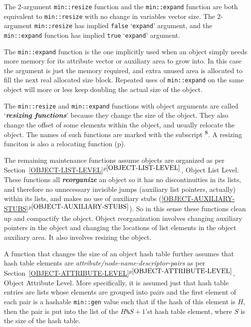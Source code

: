 \documentclass[12pt]{article}
\makeatletter
\newcommand{\skey}[2]{{\bf \em #1#2}\index{#1}}
\newcommand{\ikey}[2]{{\bf \em #1}\index{#2}}
\newcommand{\subsmkey}[2]{$\mathbf{^{#1}}$\index{#1@$^{#1}$!#2}}
\newcommand{\itemref}[1]{\ref{#1}$^{p\pageref{#1}}$}
\newcommand{\pagref}[1]{p\pageref{#1}}
\newcommand{\EOL}{\penalty \exhyphenpenalty}
\makeatother
\begin{document}
The 2-argument {\tt min::resize} function and the {\tt min::\EOL expand}
function are both equivalent to {\tt min::\EOL resize} with no change
in variables vector size.  The 2-argument {\tt min::\EOL resize}
has implied {\tt false} `{\tt expand}' argument, and the
{\tt min::\EOL expand} function has implied {\tt true} `{\tt expand}'
argument.

The {\tt min::expand} function is the one implicitly used when an object simply
needs more memory for its attribute vector or auxiliary area to grow into.
In this case the argument is just the memory required, and extra unused
area is allocated to fill the next real allocated size block.  Repeated
uses of {\tt min::expand} on the same object will more or less keep
doubling the actual size of the object.

The {\tt min::resize} and {\tt min::expand} functions with object arguments
are called `\skey{resizing function}s'\label{RESIZING-FUNCTIONS}
because they change the size of the object.  They also change
the offset of some elements within the object, and usually
relocate the object.
The names of such functions are marked with the subscript
\subsmkey{S}{of function}.  A resizing funciton is also
a relocating function (\pagref{RELOCATING-FUNCTIONS}).

The remaining maintenance functions assume objects are organized
as per Section~\itemref{OBJECT-LIST-LEVEL}, Object List Level.
These functions all \ikey{reorganize}{object}
an object so it has no discontinuities
in its lists, and therefore no unnecessary invisible jumps (auxiliary
list pointers, actually) within its lists, and makes no use of
auxiliary stubs (\itemref{OBJECT-AUXILIARY-STUBS}).  So in this
sense these functions clean up and compactify the object.  Object
reorganization involves changing auxiliary pointers in the object and
changing the locations of list elements in the object auxiliary area.
It also involves resizing the object.

A function that changes the size of an object hash table further
assumes that hash table elements are {\em attribute/node-name-descriptor-pairs}
as per Section~\itemref{OBJECT-ATTRIBUTE-LEVEL}, Object Attribute Level.
More specifically, it is assumed just that hash table entries are lists
whose elements are grouped into pairs and the first element of each
pair is a hashable {\tt min::gen} value such that if the hash of this
element is $H$, then the pair is put into the list of the $H$\verb|%|$S+1$'st
hash table element, where $S$ is the size of the hash table.
\end{document}
